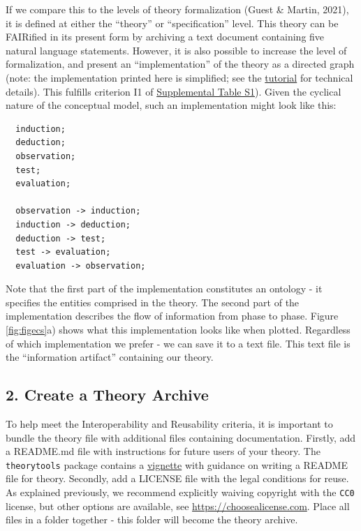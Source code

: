 \documentclass[
  man, noextraspace,floatsintext]{apa7}
\begin{document}
If we compare this to the levels of theory formalization (Guest \& Martin, 2021),
it is defined at either the ``theory'' or ``specification'' level.
This theory can be FAIRified in its present form by archiving a text document containing five natural language statements.
However, it is also possible to increase the level of formalization,
and present an ``implementation'' of the theory as a directed graph (note: the implementation printed here is simplified; see the \href{https://cjvanlissa.github.io/theorytools/articles/fair-theory.html}{tutorial} for technical details).
This fulfills criterion I1 of \href{https://github.com/cjvanlissa/fair_theory/blob/main/fair_principles.csv}{Supplemental Table S1}).
Given the cyclical nature of the conceptual model, such an implementation might look like this:

\begin{verbatim}
  induction;
  deduction;
  observation;
  test;
  evaluation;
  
  observation -> induction;
  induction -> deduction;
  deduction -> test;
  test -> evaluation;
  evaluation -> observation;
\end{verbatim}

Note that the first part of the implementation constitutes an ontology - it specifies the entities comprised in the theory.
The second part of the implementation describes the flow of information from phase to phase.
Figure \ref{fig:figecs}a) shows what this implementation looks like when plotted.
Regardless of which implementation we prefer - we can save it to a text file.
This text file is the ``information artifact'' containing our theory.

\subsection{2. Create a Theory Archive}\label{create-a-theory-archive}

To help meet the Interoperability and Reusability criteria,
it is important to bundle the theory file with additional files containing documentation.
Firstly, add a README.md file with instructions for future users of your theory.
The \texttt{theorytools} package contains a \href{https://cjvanlissa.github.io/theorytools/articles/readme.html}{vignette} with guidance on writing a README file for theory.
Secondly, add a LICENSE file with the legal conditions for reuse.
As explained previously, we recommend explicitly waiving copyright with the \texttt{CC0} license, but other options are available, see \href{https://choosealicense.com/non-software/}{https://choosealicense.com}.
Place all files in a folder together - this folder will become the theory archive.
\end{document}
